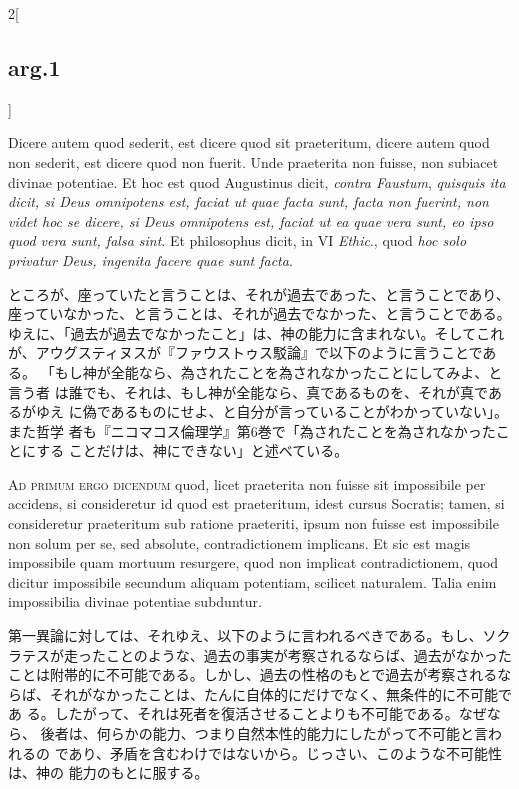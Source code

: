 \documentclass[paper=a4paper,fontsize=10pt,jafontsize=9pt,titlepage]{jlreq}
\begin{document}
\begin{paracol}{2}[\subsection{arg.1}]
\switchcolumn*

Dicere autem quod sederit, est dicere
quod sit praeteritum, dicere autem quod non sederit, est dicere quod non
fuerit. Unde praeterita non fuisse, non subiacet divinae potentiae. Et
hoc est quod Augustinus dicit, {\itshape contra Faustum}, {\itshape quisquis ita dicit, si
Deus omnipotens est, faciat ut quae facta sunt, facta non fuerint, non
videt hoc se dicere, si Deus omnipotens est, faciat ut ea quae vera
sunt, eo ipso quod vera sunt, falsa sint}. Et philosophus dicit, in VI
{\itshape Ethic}., quod {\itshape hoc solo privatur Deus, ingenita facere quae sunt facta}.

\switchcolumn

ところが、座っていたと言うことは、それが過去であった、と言うことであり、
座っていなかった、と言うことは、それが過去でなかった、と言うことである。
ゆえに、「過去が過去でなかったこと」は、神の能力に含まれない。そしてこれ
が、アウグスティヌスが『ファウストゥス駁論』で以下のように言うことである。
「もし神が全能なら、為されたことを為されなかったことにしてみよ、と言う者
は誰でも、それは、もし神が全能なら、真であるものを、それが真であるがゆえ
に偽であるものにせよ、と自分が言っていることがわかっていない」。また哲学
者も『ニコマコス倫理学』第6巻で「為されたことを為されなかったことにする
ことだけは、神にできない」と述べている。

\switchcolumn*[\subsection{ad.1}]

{\scshape Ad primum ergo dicendum} quod, licet praeterita non fuisse sit
impossibile per accidens, si consideretur id quod est praeteritum, idest
cursus Socratis; tamen, si consideretur praeteritum sub ratione
praeteriti, ipsum non fuisse est impossibile non solum per se, sed
absolute, contradictionem implicans. Et sic est magis impossibile quam
mortuum resurgere, quod non implicat contradictionem, quod dicitur
impossibile secundum aliquam potentiam, scilicet naturalem. Talia enim
impossibilia divinae potentiae subduntur.

\switchcolumn

第一異論に対しては、それゆえ、以下のように言われるべきである。もし、ソク
ラテスが走ったことのような、過去の事実が考察されるならば、過去がなかった
ことは附帯的に不可能である。しかし、過去の性格のもとで過去が考察されるな
らば、それがなかったことは、たんに自体的にだけでなく、無条件的に不可能であ
る。したがって、それは死者を復活させることよりも不可能である。なぜなら、
後者は、何らかの能力、つまり自然本性的能力にしたがって不可能と言われるの
であり、矛盾を含むわけではないから。じっさい、このような不可能性は、神の
能力のもとに服する。


\end{paracol}
\end{document}
